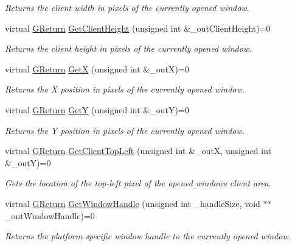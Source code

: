 \begin{DoxyCompactItemize}
\begin{DoxyCompactList}\small\item\em Returns the client width in pixels of the currently opened window. \end{DoxyCompactList}\item 
virtual \hyperlink{namespaceGW_a67a839e3df7ea8a5c5686613a7a3de21}{G\+Return} \hyperlink{classGW_1_1SYSTEM_1_1GWindow_aca175a29d6e87e4d4ed848325216c8f1}{Get\+Client\+Height} (unsigned int \&\+\_\+out\+Client\+Height)=0
\begin{DoxyCompactList}\small\item\em Returns the client height in pixels of the currently opened window. \end{DoxyCompactList}\item 
virtual \hyperlink{namespaceGW_a67a839e3df7ea8a5c5686613a7a3de21}{G\+Return} \hyperlink{classGW_1_1SYSTEM_1_1GWindow_a61da1f01be5fa48df2375701ed0062e9}{GetX} (unsigned int \&\+\_\+outX)=0
\begin{DoxyCompactList}\small\item\em Returns the X position in pixels of the currently opened window. \end{DoxyCompactList}\item 
virtual \hyperlink{namespaceGW_a67a839e3df7ea8a5c5686613a7a3de21}{G\+Return} \hyperlink{classGW_1_1SYSTEM_1_1GWindow_a58d456c963afd1b4d9235a1336d57754}{GetY} (unsigned int \&\+\_\+outY)=0
\begin{DoxyCompactList}\small\item\em Returns the Y position in pixels of the currently opened window. \end{DoxyCompactList}\item 
virtual \hyperlink{namespaceGW_a67a839e3df7ea8a5c5686613a7a3de21}{G\+Return} \hyperlink{classGW_1_1SYSTEM_1_1GWindow_ac80bfaba809d5eb54d6a11b11deddeb7}{Get\+Client\+Top\+Left} (unsigned int \&\+\_\+outX, unsigned int \&\+\_\+outY)=0
\begin{DoxyCompactList}\small\item\em Gets the location of the top-\/left pixel of the opened window\textquotesingle{}s client area. \end{DoxyCompactList}\item 
virtual \hyperlink{namespaceGW_a67a839e3df7ea8a5c5686613a7a3de21}{G\+Return} \hyperlink{classGW_1_1SYSTEM_1_1GWindow_a71b73cc2ba9b010745f0f6171dc8b950}{Get\+Window\+Handle} (unsigned int \+\_\+handle\+Size, void $\ast$$\ast$\+\_\+out\+Window\+Handle)=0
\begin{DoxyCompactList}\small\item\em Returns the platform specific window handle to the currently opened window. \end{DoxyCompactList}\item 
$$
\end{DoxyCompactItemize}
